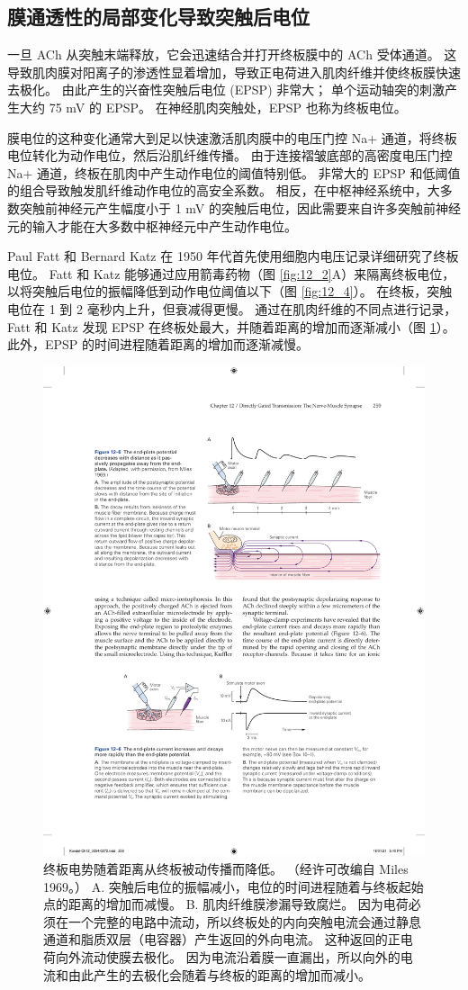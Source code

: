\subsection{膜通透性的局部变化导致突触后电位}
一旦 ACh 从突触末端释放，它会迅速结合并打开终板膜中的 ACh 受体通道。 
这导致肌肉膜对阳离子的渗透性显着增加，导致正电荷进入肌肉纤维并使终板膜快速去极化。 
由此产生的兴奋性突触后电位 (EPSP) 非常大； 
单个运动轴突的刺激产生大约 75 mV 的 EPSP。
在神经肌肉突触处，EPSP 也称为终板电位。


膜电位的这种变化通常大到足以快速激活肌肉膜中的电压门控 Na+ 通道，将终板电位转化为动作电位，然后沿肌纤维传播。 
由于连接褶皱底部的高密度电压门控 Na+ 通道，终板在肌肉中产生动作电位的阈值特别低。 
非常大的 EPSP 和低阈值的组合导致触发肌纤维动作电位的高安全系数。 
相反，在中枢神经系统中，大多数突触前神经元产生幅度小于 1 mV 的突触后电位，因此需要来自许多突触前神经元的输入才能在大多数中枢神经元中产生动作电位。


Paul Fatt 和 Bernard Katz 在 1950 年代首先使用细胞内电压记录详细研究了终板电位。 
Fatt 和 Katz 能够通过应用箭毒药物（图 \ref{fig:12_2}A）来隔离终板电位，以将突触后电位的振幅降低到动作电位阈值以下（图 \ref{fig:12_4}）。 
在终板，突触电位在 1 到 2 毫秒内上升，但衰减得更慢。 
通过在肌肉纤维的不同点进行记录，Fatt 和 Katz 发现 EPSP 在终板处最大，并随着距离的增加而逐渐减小（图 \ref{fig:12_5}）。 
此外，EPSP 的时间进程随着距离的增加而逐渐减慢。

\begin{figure}[htbp]
	\centering
	\includegraphics[width=0.6\linewidth]{chap12/fig_12_5}
	\caption{终板电势随着距离从终板被动传播而降低。 （经许可改编自 Miles 1969。） 
		A. 突触后电位的振幅减小，电位的时间进程随着与终板起始点的距离的增加而减慢。 
		B. 肌肉纤维膜渗漏导致腐烂。 
		因为电荷必须在一个完整的电路中流动，所以终板处的内向突触电流会通过静息通道和脂质双层（电容器）产生返回的外向电流。 
		这种返回的正电荷向外流动使膜去极化。 
		因为电流沿着膜一直漏出，所以向外的电流和由此产生的去极化会随着与终板的距离的增加而减小。}
	\label{fig:12_5}
\end{figure}

